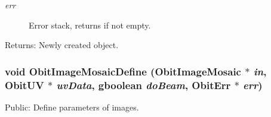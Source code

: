 \begin{Desc}
\begin{description}
\item[{\em err}]Error stack, returns if not empty. \end{description}
\end{Desc}
\begin{Desc}
\item[Returns:]Newly created object. \end{Desc}
\subsubsection{\setlength{\rightskip}{0pt plus 5cm}void Obit\-Image\-Mosaic\-Define ({\bf Obit\-Image\-Mosaic} $\ast$ {\em in}, {\bf Obit\-UV} $\ast$ {\em uv\-Data}, gboolean {\em do\-Beam}, {\bf Obit\-Err} $\ast$ {\em err})}\label{ObitImageMosaic_8h_a18}


Public: Define parameters of images. 

